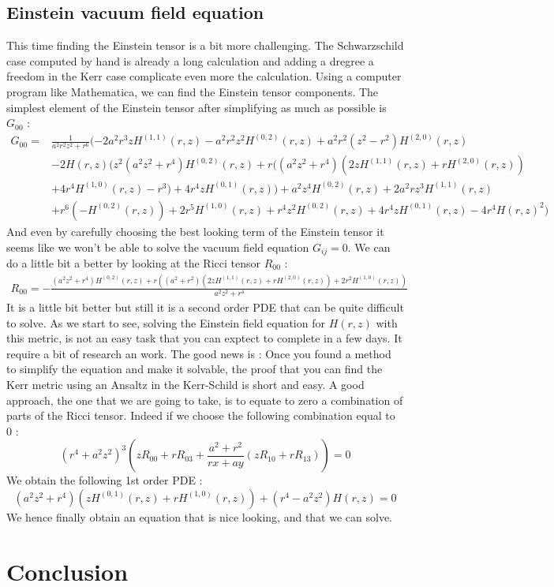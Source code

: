\documentclass[a4paper,12pt]{article}
\theoremstyle{definition}
\begin{document}
\subsection{Einstein vacuum field equation}
This time finding the Einstein tensor is a bit more challenging.
The Schwarzschild case computed by hand is already a long calculation and adding a dregree a freedom in the Kerr case complicate even more the calculation.
Using a computer program like Mathematica, we can find the Einstein tensor components.
The simplest element of the Einstein tensor after simplifying as much as possible is $G_{00}$ :
\begin{align*}
	G_{00} = &\frac{1}{a^2 r^2z^2+r^6}(-2 a^2 r^3 z H^{(1,1)}(r,z)-a^2 r^2 z^2 H^{(0,2)}(r,z)+a^2 r^2(z^2-r^2) H^{(2,0)}(r,z)\\
	&-2 H(r,z) (z^2 (a^2z^2+r^4) H^{(0,2)}(r,z)+r ((a^2 z^2+r^4)(2 z H^{(1,1)}(r,z)+r H^{(2,0)}(r,z))\\
	&+4r^4H^{(1,0)}(r,z)-r^3)+4 r^4 z H^{(0,1)}(r,z))+a^2 z^4H^{(0,2)}(r,z)+2 a^2 r z^3 H^{(1,1)}(r,z)\\
	&+r^6(-H^{(0,2)}(r,z))+2 r^5 H^{(1,0)}(r,z)+r^4 z^2H^{(0,2)}(r,z)+4 r^4 z H^{(0,1)}(r,z)-4 r^4 H(r,z)^2)
\end{align*}
And even by carefully choosing the best looking term of the Einstein tensor it seems like we won't be able to solve the vacuum field equation $G_{ij}=0$.
We can do a little bit a better by looking at the Ricci tensor $R_{00}$ :
\begin{align*}
	R_{00}=-\frac{(a^2 z^2+r^4) H^{(0,2)}(r,z)+r
	((a^2+r^2) (2 z H^{(1,1)}(r,z)+r
	H^{(2,0)}(r,z))+2 r^2 H^{(1,0)}(r,z))}{a^2 z^2+r^4}
\end{align*}
It is a little bit better but still it is a second order PDE that can be quite difficult to solve.
As we start to see, solving the Einstein field equation for $H(r,z)$ with this metric, is not an easy task that you can exptect to complete in a few days.
It require a bit of research an work.
The good news is : Once you found a method to simplify the equation and make it solvable, the proof that you can find the Kerr metric using an Ansaltz in the Kerr-Schild is short and easy.
A good approach, the one that we are going to take, is to equate to zero a combination of parts of the Ricci tensor.
Indeed if we choose the following combination equal to $0$ :
\begin{equation*}
	(r^4+a^2z^2)^3(zR_{00}+rR_{03}+\frac{a^2+r^2}{rx+ay}(zR_{10}+rR_{13}))=0
\end{equation*}
We obtain the following 1st order PDE :
\begin{equation}
	(a^2 z^2+r^4) (z H^{(0,1)}(r,z)+rH^{(1,0)}(r,z))+(r^4-a^2 z^2) H(r,z)=0
\end{equation}
We hence finally obtain an equation that is nice looking, and that we can solve.

\section{Conclusion}
\end{document}
